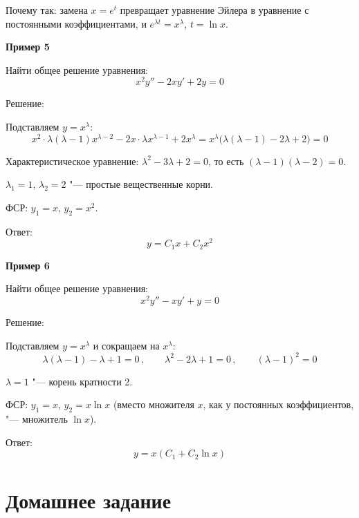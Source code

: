 \documentclass[11pt,a4paper]{article}
\newcommand{\example}[1]{\par\medskip\noindent\textbf{#1}\par\nopagebreak\smallskip}
\begin{document}
Почему так: замена $x = e^{t}$ превращает уравнение Эйлера в уравнение с постоянными коэффициентами, и $e^{\lambda t} = x^{\lambda}$, $t = \ln x$.

\example{Пример 5}

Найти общее решение уравнения:
\[
  x^2 y'' - 2xy' + 2y = 0
\]

Решение:

Подставляем $y = x^{\lambda}$:
\[
  x^2 \cdot \lambda(\lambda-1)x^{\lambda-2} - 2x \cdot \lambda x^{\lambda-1} + 2x^{\lambda} = x^{\lambda}\bigl(\lambda(\lambda-1) - 2\lambda + 2\bigr) = 0
\]

Характеристическое уравнение: $\lambda^2 - 3\lambda + 2 = 0$, то есть $(\lambda - 1)(\lambda - 2) = 0$.

$\lambda_1 = 1$, $\lambda_2 = 2$ "--- простые вещественные корни.

ФСР: $y_1 = x$, $y_2 = x^2$.

Ответ:
\[
  y = C_1 x + C_2 x^2
\]

\example{Пример 6}

Найти общее решение уравнения:
\[
  x^2 y'' - xy' + y = 0
\]

Решение:

Подставляем $y = x^{\lambda}$ и сокращаем на $x^{\lambda}$:
\[
  \lambda(\lambda-1) - \lambda + 1 = 0\,, \qquad \lambda^2 - 2\lambda + 1 = 0\,, \qquad (\lambda - 1)^2 = 0
\]

$\lambda = 1$ "--- корень кратности 2.

ФСР: $y_1 = x$, $y_2 = x\ln x$ (вместо множителя $x$, как у постоянных коэффициентов, "--- множитель $\ln x$).

Ответ:
\[
  y = x(C_1 + C_2\ln x)
\]

\newpage

\section*{Домашнее задание}
\end{document}
